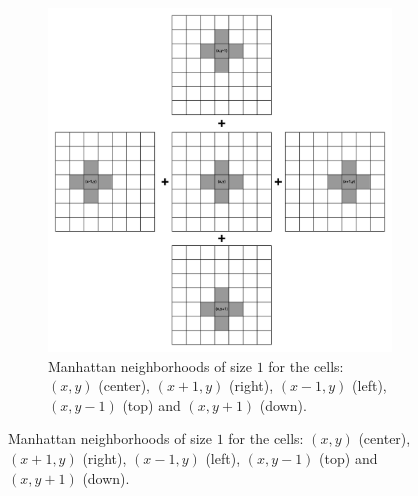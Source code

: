 \begin{figure}
    \vspace*{-0.5in}
    \centering
    
    \begin{subfigure}[t]{1.0\textwidth}
        \centering
        \includegraphics[width=\textwidth]{sources/max_manhattan/images/neighborhoodDP1_1}
        \caption[]{Manhattan neighborhoods of size $1$ for the cells:  $(x,y)$ (center), $(x+1,y)$ (right), $(x-1,y)$ (left), $(x,y-1)$ (top) and $(x,y+1)$ (down).}
        \label{fig:max_manhattan:neighborhoodDP1_1}
     \end{subfigure}
    
     \hfill
    

\end{figure}
